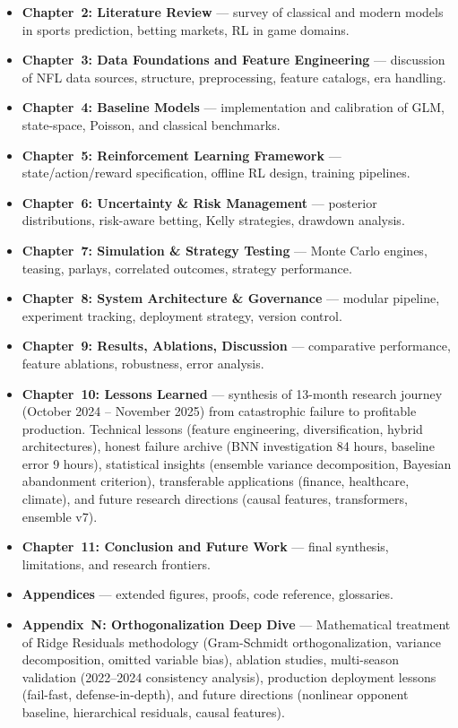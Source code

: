 \begin{itemize}
  \item \textbf{Chapter~2: Literature Review} — survey of classical and modern models in sports prediction, betting markets, RL in game domains.
  \item \textbf{Chapter~3: Data Foundations and Feature Engineering} — discussion of NFL data sources, structure, preprocessing, feature catalogs, era handling.
  \item \textbf{Chapter~4: Baseline Models} — implementation and calibration of GLM, state-space, Poisson, and classical benchmarks.
  \item \textbf{Chapter~5: Reinforcement Learning Framework} — state/action/reward specification, offline RL design, training pipelines.
  \item \textbf{Chapter~6: Uncertainty \& Risk Management} — posterior distributions, risk-aware betting, Kelly strategies, drawdown analysis.
  \item \textbf{Chapter~7: Simulation \& Strategy Testing} — Monte Carlo engines, teasing, parlays, correlated outcomes, strategy performance.
  \item \textbf{Chapter~8: System Architecture \& Governance} — modular pipeline, experiment tracking, deployment strategy, version control.
  \item \textbf{Chapter~9: Results, Ablations, Discussion} — comparative performance, feature ablations, robustness, error analysis.
  \item \textbf{Chapter~10: Lessons Learned} — synthesis of 13-month research journey (October 2024 -- November 2025) from catastrophic failure to profitable production. Technical lessons (feature engineering, diversification, hybrid architectures), honest failure archive (BNN investigation 84 hours, baseline error 9 hours), statistical insights (ensemble variance decomposition, Bayesian abandonment criterion), transferable applications (finance, healthcare, climate), and future research directions (causal features, transformers, ensemble v7).
  \item \textbf{Chapter~11: Conclusion and Future Work} — final synthesis, limitations, and research frontiers.
  \item \textbf{Appendices} — extended figures, proofs, code reference, glossaries.
  \item \textbf{Appendix~N: Orthogonalization Deep Dive} — Mathematical treatment of Ridge Residuals methodology (Gram-Schmidt orthogonalization, variance decomposition, omitted variable bias), ablation studies, multi-season validation (2022--2024 consistency analysis), production deployment lessons (fail-fast, defense-in-depth), and future directions (nonlinear opponent baseline, hierarchical residuals, causal features).

\end{itemize}
